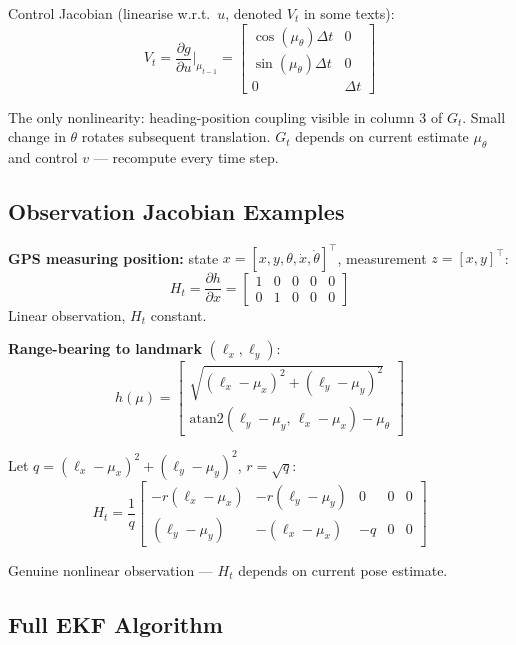 \documentclass[11pt,a4paper]{article}
\begin{document}
Control Jacobian (linearise w.r.t.\ $u$, denoted $V_t$ in some texts):
\begin{equation}
V_t = \frac{\partial g}{\partial u}\bigg|_{\mu_{t-1}} = \begin{bmatrix}\cos(\mu_\theta)\Delta t & 0 \\ \sin(\mu_\theta)\Delta t & 0 \\ 0 & \Delta t\end{bmatrix}
\end{equation}

The only nonlinearity: heading-position coupling visible in column 3 of $G_t$. Small change in $\theta$ rotates subsequent translation. $G_t$ depends on current estimate $\mu_\theta$ and control $v$ --- recompute every time step.

\subsection{Observation Jacobian Examples}

\textbf{GPS measuring position:} state $x = [x, y, \theta, \dot{x}, \dot{\theta}]^\top$, measurement $z = [x, y]^\top$:
\[
H_t = \frac{\partial h}{\partial x} = \begin{bmatrix}1 & 0 & 0 & 0 & 0 \\ 0 & 1 & 0 & 0 & 0\end{bmatrix}
\]
Linear observation, $H_t$ constant.

\textbf{Range-bearing to landmark} $(\ell_x, \ell_y)$:
\[
h(\mu) = \begin{bmatrix}\sqrt{(\ell_x - \mu_x)^2 + (\ell_y - \mu_y)^2} \\ \mathrm{atan2}(\ell_y - \mu_y,\, \ell_x - \mu_x) - \mu_\theta\end{bmatrix}
\]

Let $q = (\ell_x - \mu_x)^2 + (\ell_y - \mu_y)^2$, $r = \sqrt{q}$:
\[
H_t = \frac{1}{q}\begin{bmatrix}-r(\ell_x - \mu_x) & -r(\ell_y - \mu_y) & 0 & 0 & 0 \\ (\ell_y - \mu_y) & -(\ell_x - \mu_x) & -q & 0 & 0\end{bmatrix}
\]

Genuine nonlinear observation --- $H_t$ depends on current pose estimate.

\subsection{Full EKF Algorithm}
\end{document}
